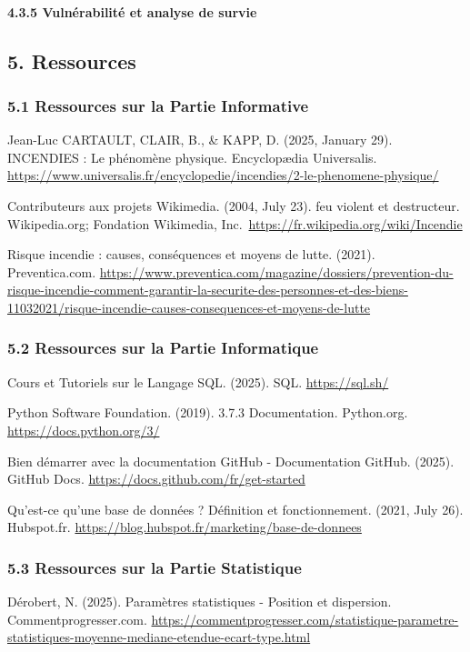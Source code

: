 \documentclass[
]{article}
\begin{document}
\paragraph{4.3.5 Vulnérabilité et analyse de
survie}\label{vulnuxe9rabilituxe9-et-analyse-de-survie}

\subsection{5. Ressources}\label{ressources}

\subsubsection{5.1 Ressources sur la Partie
Informative}\label{ressources-sur-la-partie-informative}

Jean-Luc CARTAULT, CLAIR, B., \& KAPP, D. (2025, January 29). INCENDIES
: Le phénomène physique. Encyclopædia Universalis.
\url{https://www.universalis.fr/encyclopedie/incendies/2-le-phenomene-physique/}

Contributeurs aux projets Wikimedia. (2004, July 23). feu violent et
destructeur. Wikipedia.org; Fondation Wikimedia,
Inc.~\url{https://fr.wikipedia.org/wiki/Incendie}

Risque incendie : causes, conséquences et moyens de lutte. (2021).
Preventica.com.
\url{https://www.preventica.com/magazine/dossiers/prevention-du-risque-incendie-comment-garantir-la-securite-des-personnes-et-des-biens-11032021/risque-incendie-causes-consequences-et-moyens-de-lutte}

\subsubsection{5.2 Ressources sur la Partie
Informatique}\label{ressources-sur-la-partie-informatique}

Cours et Tutoriels sur le Langage SQL. (2025). SQL.
\url{https://sql.sh/}

Python Software Foundation. (2019). 3.7.3 Documentation. Python.org.
\url{https://docs.python.org/3/}

Bien démarrer avec la documentation GitHub - Documentation GitHub.
(2025). GitHub Docs. \url{https://docs.github.com/fr/get-started}

Qu'est-ce qu'une base de données ? Définition et fonctionnement. (2021,
July 26). Hubspot.fr.
\url{https://blog.hubspot.fr/marketing/base-de-donnees}

\subsubsection{5.3 Ressources sur la Partie
Statistique}\label{ressources-sur-la-partie-statistique}

Dérobert, N. (2025). Paramètres statistiques - Position et dispersion.
Commentprogresser.com.
\url{https://commentprogresser.com/statistique-parametre-statistiques-moyenne-mediane-etendue-ecart-type.html}
\end{document}
